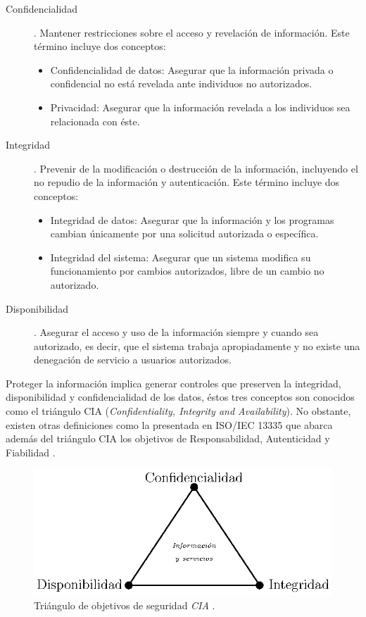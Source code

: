 \begin{description}
	\item [Confidencialidad]. Mantener restricciones sobre el acceso y revelación de información. Este término incluye dos conceptos:
		\begin{itemize}[noitemsep]
			\item Confidencialidad de datos: Asegurar que la información privada o confidencial no está revelada ante individuos no autorizados.
			\item Privacidad: Asegurar que la información revelada a los individuos sea relacionada con éste.
		\end{itemize} 
	
	\item [Integridad].  Prevenir de la modificación o destrucción de la información, incluyendo el no repudio de la información y autenticación. Este término incluye dos conceptos:
	\begin{itemize}[noitemsep]
			\item Integridad de datos: Asegurar que la información y los programas cambian únicamente por una solicitud autorizada o específica.
			\item Integridad del sistema: Asegurar que un sistema modifica su funcionamiento por cambios autorizados, libre de un cambio no autorizado.
		\end{itemize} 
	
	\item [Disponibilidad]. Asegurar el acceso y uso de la información siempre y cuando sea autorizado, es decir, que el sistema trabaja apropiadamente y no existe una denegación de servicio a usuarios autorizados. 
	
\end{description}

Proteger la información implica generar controles que preserven la integridad, disponibilidad y confidencialidad de los datos, éstos tres conceptos son conocidos como el triángulo CIA (\textit{Confidentiality, Integrity and Availability}). No obstante, existen otras definiciones como la presentada en ISO/IEC 13335 que abarca además del triángulo CIA los objetivos de Responsabilidad, Autenticidad y Fiabilidad \cite{Val19}.

\begin{figure}[h!]
  \centering
    \includegraphics[scale=1]{Imagenes/ciaObj.eps}
    \caption{Triángulo de objetivos de seguridad \textit{CIA} \cite{Sta11}.}
    \label{diagrama-tr1}
\end{figure}	

